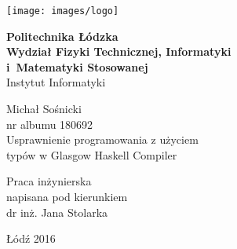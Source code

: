 \begin{titlepage}

\noindent
\begin{minipage}{0.19\textwidth}
\begin{flushleft}
\texttt{[image: images/logo]}
\end{flushleft}
\end{minipage}
\begin{minipage}[t][][t]{0.81\textwidth}
\begin{flushleft}
\vspace{-2\baselineskip}
\textbf{{\large Politechnika Łódzka}\\}
\vspace{\medskipamount}
\textbf{\large Wydział Fizyki Technicznej, Informatyki\\i~Matematyki Stosowanej}
\vspace{\medskipamount}\\
{\large Instytut Informatyki}\\
\end{flushleft}
\end{minipage}
\vspace{2.5cm}

\begin{center}
{\Large Michał Sośnicki\\nr albumu 180692\\}
\vspace{2cm}
{\huge Usprawnienie programowania z użyciem\\typów w Glasgow Haskell Compiler}
\end{center}
\vspace{3cm}
\hfill
\begin{minipage}{.55\columnwidth}
Praca inżynierska\\
napisana pod kierunkiem\\
dr inż. Jana Stolarka
\end{minipage}
\vfill
\begin{center}
Łódź 2016
\end{center}
\end{titlepage}
